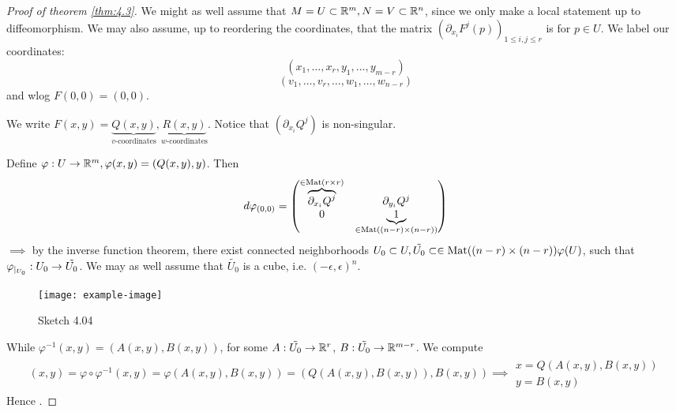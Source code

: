 \begin{proof}[Proof of theorem \ref{thm:4.3}]
     We might as well assume that \(M=U\subset \mathbb{R}^m,N=V\subset\mathbb{R}^n\), since we only make a local statement up to diffeomorphism.
    We may also assume, up to reordering the coordinates, that the matrix \((\partial_{x_i}F^j(p))_{1\leq i,j\leq r}\)
    is  for \(p\in U\). We label our coordinates:  \[(x_1,\dots,x_r,y_1,\dots,y_{m-r})\] 
    \[(v_1,\dots,v_r,\dots,w_1,\dots,w_{n-r})\]
    and wlog \(F(0,0)=(0,0)\).

    We write \(F(x,y)=\underbrace{Q(x,y)}_{v\text{-coordinates}},\underbrace{R(x,y)}_{w\text{-coordinates}}\). Notice that \((\partial_{x_i}Q^j)\)
    is non-singular.

     Define \(\varphi:U\to\mathbb{R}^m,\varphi(x,y)=(Q(x,y),y)\). Then \begin{align*}
        d\varphi_{(0,0)}=\begin{pmatrix}
            \overbrace{\partial_{x_i}Q^j}^{\in {\text{Mat}}(r\times r)} & \partial_{y_i}Q^j\\
            0 & \underbrace{1}_{\in {\text{Mat}}((n-r)\times (n-r))}
        \end{pmatrix}
    \end{align*}
    \(\implies\) by the inverse function theorem, there  exist connected neighborhoods \(U_0\subset U,\tilde{U_0}\subset \in {\text{Mat}}((n-r)\times (n-r))\varphi(U)\),
    such that \(\varphi_{|_{U_0}}:U_0\to\tilde{U_0}\). We may as well assume that \(\tilde{U_0}\) is a cube, i.e. \((-\epsilon,\epsilon)^n\).
    \begin{figure}[H]
        \centering
        \texttt{[image: example-image]}
        \caption{Sketch 4.04}
    \end{figure}
    While \(\varphi^{-1}(x,y)=(A(x,y),B(x,y))\), for some \(A:\tilde{U_0}\to\mathbb{R}^r\), \(B:\tilde{U_0}\to\mathbb{R}^{m-r}\).
    We compute \begin{align*}
        (x,y)=\varphi\circ\varphi^{-1}(x,y)=\varphi\left(A(x,y),B(x,y)\right)=(Q(A(x,y),B(x,y)),B(x,y))\implies \substack{x=Q(A(x,y),B(x,y))\\y=B(x,y)}
    \end{align*}
    Hence .


\end{proof}

